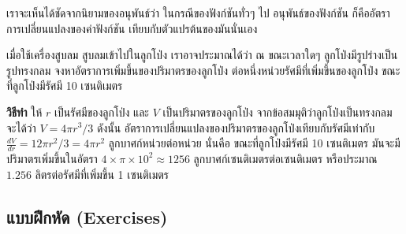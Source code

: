 \documentclass[
]{book}
\begin{document}
เราจะเห็นได้ชัดจากนิยามของอนุพันธ์ว่า ในกรณีของฟังก์ชันทั่วๆ ไป อนุพันธ์ของฟังก์ชัน
ก็คืออัตราการเปลี่ยนแปลงของค่าฟังก์ชัน เทียบกับตัวแปรต้นของมันนั่นเอง

เมื่อใช้เครื่องสูบลม สูบลมเข้าไปในลูกโป่ง เราอาจประมาณได้ว่า ณ ขณะเวลาใดๆ
ลูกโป่งมีรูปร่างเป็นรูปทรงกลม จงหาอัตราการเพิ่มขึ้นของปริมาตรของลูกโป่ง
ต่อหนึ่งหน่วยรัศมีที่เพิ่มขึ้นของลูกโป่ง ขณะที่ลูกโป่งมีรัศมี 10 เซนติเมตร

\textbf{วิธีทำ} ให้ \(r\) เป็นรัศมีของลูกโป่ง และ \(V\) เป็นปริมาตรของลูกโป่ง
จากข้อสมมุติว่าลูกโป่งเป็นทรงกลม จะได้ว่า \(V=4\pi r^3/3\) ดังนั้น
อัตราการเปลี่ยนแปลงของปริมาตรของลูกโป่งเทียบกับรัศมีเท่ากับ
\(\displaystyle\frac{dV}{dr}=12\pi r^2/3=4\pi r^2\) ลูกบาศก์หน่วยต่อหน่วย
นั่นคือ ขณะที่ลูกโป่งมีรัศมี 10 เซนติเมตร มันจะมีปริมาตรเพิ่มขึ้นในอัตรา
\(4\times\pi\times10^2\approx1256\) ลูกบาศก์เซนติเมตรต่อเซนติเมตร หรือประมาณ
\(1.256\) ลิตรต่อรัศมีที่เพิ่มขึ้น 1 เซนติเมตร

\subsection{แบบฝึกหัด
(Exercises)}\label{uxe41uxe1auxe1auxe1duxe01uxe2buxe14-exercises}
\end{document}
